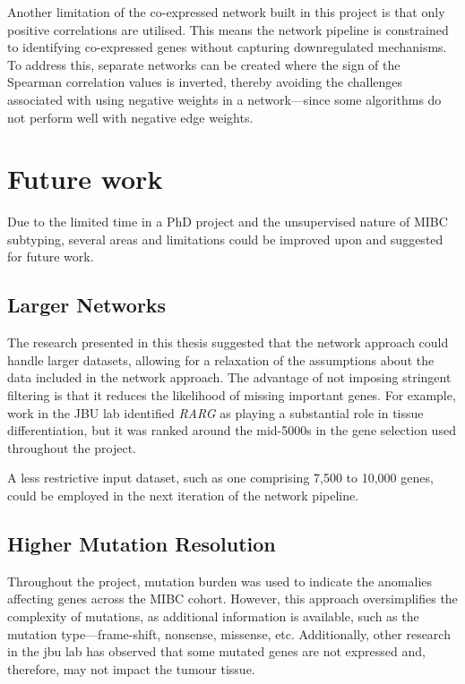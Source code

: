 Another limitation of the co-expressed network built in this project is that only positive correlations are utilised. This means the network pipeline is constrained to identifying co-expressed genes without capturing downregulated mechanisms. To address this, separate networks can be created where the sign of the Spearman correlation values is inverted, thereby avoiding the challenges associated with using negative weights in a network—since some algorithms do not perform well with negative edge weights.


\section{Future work} \label{s:future_work}

Due to the limited time in a PhD project and the unsupervised nature of MIBC subtyping, several areas and limitations could be improved upon and suggested for future work.

\subsection*{Larger Networks}

The research presented in this thesis suggested that the network approach could handle larger datasets, allowing for a relaxation of the assumptions about the data included in the network approach. The advantage of not imposing stringent filtering is that it reduces the likelihood of missing important genes. For example, work in the JBU lab identified \textit{RARG} as playing a substantial role in tissue differentiation, but it was ranked around the mid-5000s in the gene selection used throughout the project.

A less restrictive input dataset, such as one comprising 7,500 to 10,000 genes, could be employed in the next iteration of the network pipeline.

\subsection*{Higher Mutation Resolution}

Throughout the project, mutation burden was used to indicate the anomalies affecting genes across the MIBC cohort. However, this approach oversimplifies the complexity of mutations, as additional information is available, such as the mutation type—frame-shift, nonsense, missense, etc. Additionally, other research in the \acrlong{jbu} lab has observed that some mutated genes are not expressed and, therefore, may not impact the tumour tissue.


